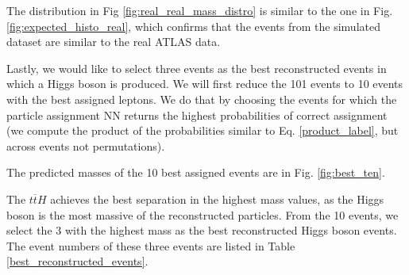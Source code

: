 \documentclass{ctuthesis}
\begin{document}
\begin{figure}[h]
\end{figure}

The distribution in Fig \ref{fig:real_real_mass_distro} is similar to the one in Fig. \ref{fig:expected_histo_real}, which confirms that the events from the simulated dataset are similar to the real ATLAS data.

Lastly, we would like to select three events as the best reconstructed events in which a Higgs boson is produced. We will first reduce the 101 events to 10 events with the best assigned leptons. We do that by choosing the events for which the particle assignment NN returns the highest probabilities of correct assignment (we compute the product of the probabilities similar to Eq. \ref{product_label}, but across events not permutations).

The predicted masses of the 10 best assigned events are in Fig. \ref{fig:best_ten}.

\begin{figure}[h]
\end{figure}

The $t\overline{t}H$ achieves the best separation in the highest mass values, as the Higgs boson is the most massive of the reconstructed particles. From the 10 events, we select the 3 with the highest mass as the best reconstructed Higgs boson events. The event numbers of these three events are listed in Table \ref{best_reconstructed_events}.
\end{document}
